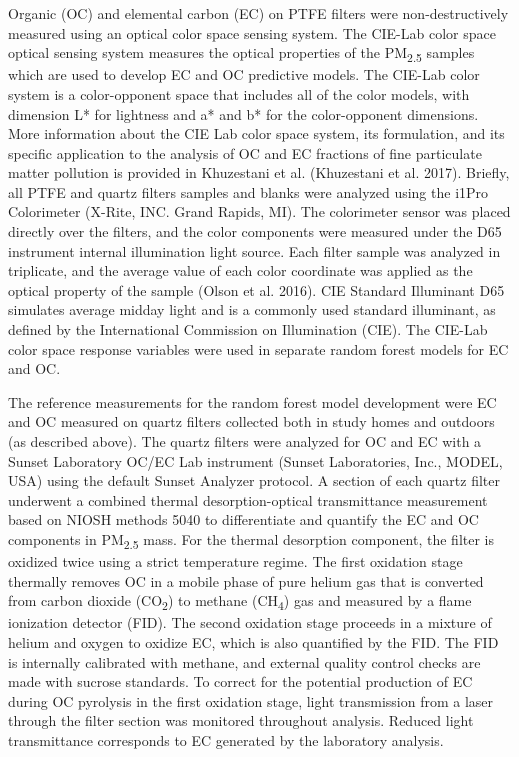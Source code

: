 \documentclass[
  letterpaper,
  DIV=11,
  numbers=noendperiod]{scrartcl}
\begin{document}
Organic (OC) and elemental carbon (EC) on PTFE filters were
non-destructively measured using an optical color space sensing system.
The CIE-Lab color space optical sensing system measures the optical
properties of the PM\textsubscript{2.5} samples which are used to
develop EC and OC predictive models. The CIE-Lab color system is a
color-opponent space that includes all of the color models, with
dimension L* for lightness and a* and b* for the color-opponent
dimensions. More information about the CIE Lab color space system, its
formulation, and its specific application to the analysis of OC and EC
fractions of fine particulate matter pollution is provided in Khuzestani
et al. (Khuzestani et al. 2017). Briefly, all PTFE and quartz filters
samples and blanks were analyzed using the i1Pro Colorimeter (X-Rite,
INC. Grand Rapids, MI). The colorimeter sensor was placed directly over
the filters, and the color components were measured under the D65
instrument internal illumination light source. Each filter sample was
analyzed in triplicate, and the average value of each color coordinate
was applied as the optical property of the sample (Olson et al. 2016).
CIE Standard Illuminant D65 simulates average midday light and is a
commonly used standard illuminant, as defined by the International
Commission on Illumination (CIE). The CIE-Lab color space response
variables were used in separate random forest models for EC and OC.

The reference measurements for the random forest model development were
EC and OC measured on quartz filters collected both in study homes and
outdoors (as described above). The quartz filters were analyzed for OC
and EC with a Sunset Laboratory OC/EC Lab instrument (Sunset
Laboratories, Inc., MODEL, USA) using the default Sunset Analyzer
protocol. A section of each quartz filter underwent a combined thermal
desorption-optical transmittance measurement based on NIOSH methods 5040
to differentiate and quantify the EC and OC components in
PM\textsubscript{2.5} mass. For the thermal desorption component, the
filter is oxidized twice using a strict temperature regime. The first
oxidation stage thermally removes OC in a mobile phase of pure helium
gas that is converted from carbon dioxide (CO\textsubscript{2}) to
methane (CH\textsubscript{4}) gas and measured by a flame ionization
detector (FID). The second oxidation stage proceeds in a mixture of
helium and oxygen to oxidize EC, which is also quantified by the FID.
The FID is internally calibrated with methane, and external quality
control checks are made with sucrose standards. To correct for the
potential production of EC during OC pyrolysis in the first oxidation
stage, light transmission from a laser through the filter section was
monitored throughout analysis. Reduced light transmittance corresponds
to EC generated by the laboratory analysis.
\end{document}
